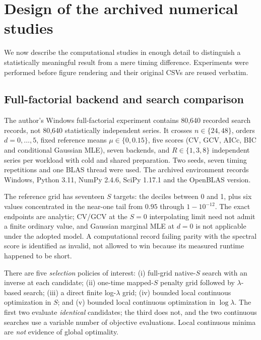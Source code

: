 \section{Design of the archived numerical studies}
\label{sec:expanded-design}
We now describe the computational studies in enough detail
to distinguish a statistically meaningful result from a
mere timing difference. Experiments were performed
before figure rendering and their original CSVs are
reused verbatim.

\subsection{Full-factorial backend and search comparison}
The author's Windows full-factorial experiment contains
80,640 recorded search records, not 80,640 statistically
independent series. It crosses $n\in\{24,48\}$,
orders $d=0,\ldots,5$, fixed reference means
$\mu\in\{0,0.15\}$, five scores (CV, GCV,
AICc, BIC and conditional Gaussian MLE),
seven backends, and $R\in\{1,3,8\}$ independent
series per workload with cold and shared preparation.
Two seeds, seven timing repetitions and one
BLAS thread were used. The archived environment
records Windows, Python 3.11, NumPy 2.4.6,
SciPy 1.17.1 and the OpenBLAS version.

The reference grid has seventeen $S$ targets:
the deciles between 0 and 1, plus six values
concentrated in the near-one tail from $0.95$
through $1-10^{-12}$. The exact endpoints
are analytic; CV/GCV at the $S=0$
interpolating limit need not admit a finite
ordinary value, and Gaussian marginal MLE
at $d=0$ is not applicable under the adopted model.
A computational record failing parity with the
spectral score is identified as invalid, not
allowed to win because its measured runtime
happened to be short.

There are five \emph{selection} policies of interest:
(i) full-grid native-$S$ search with an inverse
at each candidate; (ii) one-time mapped-$S$
penalty grid followed by $\lambda$-based search;
(iii) a direct finite log-$\lambda$ grid;
(iv) bounded local continuous optimization in
$S$; and (v) bounded local continuous optimization
in $\log\lambda$. The first two evaluate
\emph{identical} candidates; the third does
not, and the two continuous searches use a
variable number of objective evaluations.
Local continuous minima are \emph{not} evidence
of global optimality.

